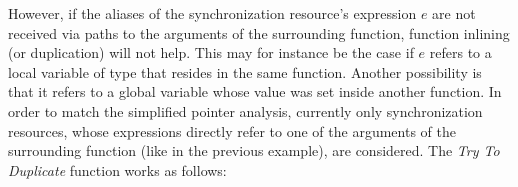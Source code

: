However, if the aliases of the synchronization resource's expression $e$ are not received via paths to the arguments of the surrounding function, function inlining (or duplication) will not help. This may for instance be the case if $e$ refers to a local variable of type  that resides in the same function. Another possibility is that it refers to a global variable whose value was set inside another function. In order to match the simplified pointer analysis, currently only synchronization resources, whose expressions directly refer to one of the arguments of the surrounding function (like in the previous example), are considered. The \textit{Try To Duplicate} function works as follows:

\vspace{4mm}

